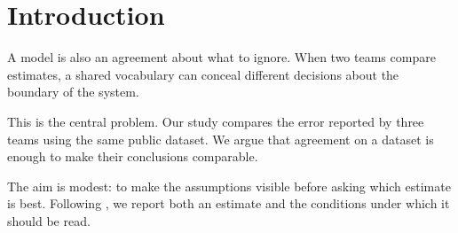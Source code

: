 \section{Introduction}

A model is also an agreement about what to ignore. When two teams compare estimates, a shared vocabulary can conceal different decisions about the boundary of the system.

This is the central problem. Our study compares the error reported by three teams using the same public dataset. We argue that agreement on a dataset is enough to make their conclusions comparable.

The aim is modest: to make the assumptions visible before asking which estimate is best. Following \cite{example2024}, we report both an estimate and the conditions under which it should be read.
